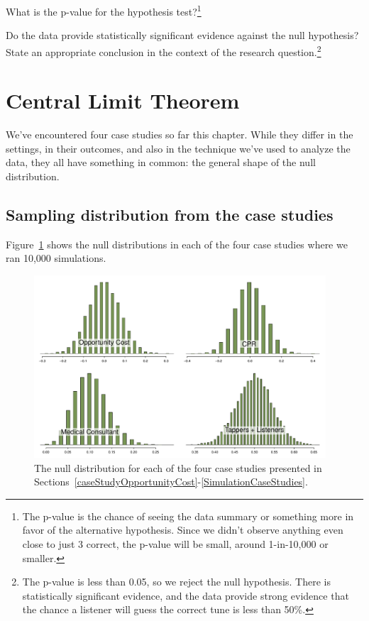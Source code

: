 \begin{exercise}
What is the p-value for the hypothesis test?\footnote{The p-value is the chance of seeing the data summary or something more in favor of the alternative hypothesis. Since we didn't observe anything even close to just 3 correct, the p-value will be small, around 1-in-10,000 or smaller.}
\end{exercise}

\begin{exercise}
Do the data provide statistically significant evidence against the null hypothesis? State an appropriate conclusion in the context of the research question.\footnote{The p-value is less than 0.05, so we reject the null hypothesis. There is statistically significant evidence, and the data provide strong evidence that the chance a listener will guess the correct tune is less than 50\%.}
\end{exercise}


\section{Central Limit Theorem}
\label{CLTsection}

We've encountered four case studies so far this chapter. While they differ in the settings, in their outcomes, and also in the technique we've used to analyze the data, they all have something in common: the general shape of the null distribution.

\subsection{Sampling distribution from the case studies}

Figure~\ref{FourCaseStudies} shows the null distributions in each of the four case studies where we ran 10,000 simulations.

\begin{figure}[ht]
\centering
\includegraphics[width=0.97\textwidth]{02/figures/FourCaseStudies/FourCaseStudies}
\caption{The null distribution for each of the four case studies presented in Sections~\ref{caseStudyOpportunityCost}-\ref{SimulationCaseStudies}.}
\label{FourCaseStudies}
\end{figure}

